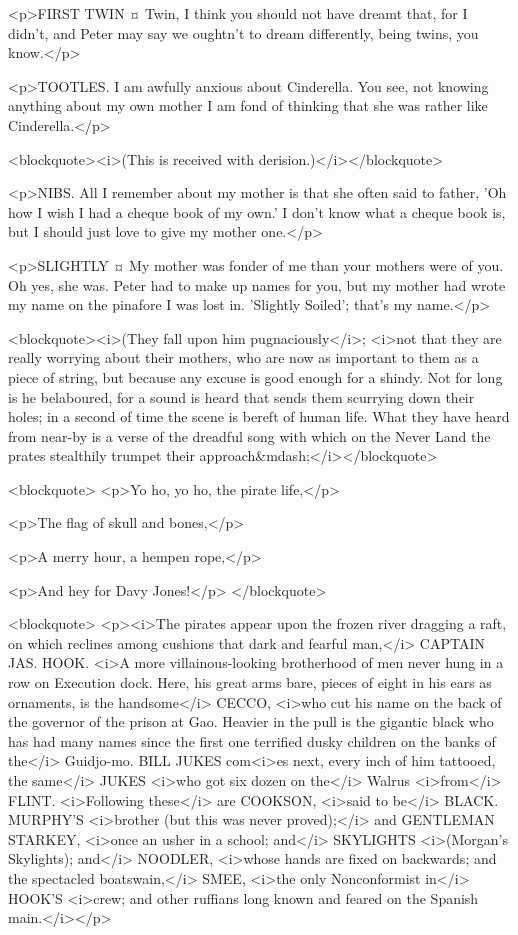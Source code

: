 <p>FIRST TWIN ¤
Twin, I think you should not have dreamt that, for I didn't, and Peter may say we oughtn't to dream differently, being twins, you know.</p>

<p>TOOTLES. I am awfully anxious about Cinderella. You see, not knowing anything about my own mother I am fond of thinking that she was rather like Cinderella.</p>

<blockquote><i>(This is received with derision.)</i></blockquote>

<p>NIBS. All I remember about my mother is that she often said to father, 'Oh how I wish I had a cheque book of my own.' I don't know what a cheque book is, but I should just love to give my mother one.</p>

<p>SLIGHTLY ¤
My mother was fonder of me than your mothers were of you.
Oh yes, she was. Peter had to make up names for you, but my mother had wrote my name on the pinafore I was lost in. 'Slightly Soiled'; that's my name.</p>

<blockquote><i>(They fall upon him pugnaciously</i>; <i>not that they are really worrying about their mothers, who are now as important to them as a piece of string, but because any excuse is good enough for a shindy. Not for long is he belaboured, for a sound is heard that sends them scurrying down their holes; in a second of time the scene is bereft of human life. What they have heard from near-by is a verse of the dreadful song with which on the Never Land the prates stealthily trumpet their approach&mdash;</i></blockquote>

<blockquote> <p>Yo ho, yo ho, the pirate life,</p>

<p>The flag of skull and bones,</p>

<p>A merry hour, a hempen rope,</p>

<p>And hey for Davy Jones!</p> </blockquote>

<blockquote> <p><i>The pirates appear upon the frozen river dragging a raft, on which reclines among cushions that dark and fearful man,</i> CAPTAIN JAS. HOOK. <i>A more villainous-looking brotherhood of men never hung in a row on Execution dock. Here, his great arms bare, pieces of eight in his ears as ornaments, is the handsome</i> CECCO, <i>who cut his name on the back of the governor of the prison at Gao. Heavier in the pull is the gigantic black who has had many names since the first one terrified dusky children on the banks of the</i> Guidjo-mo. BILL JUKES com<i>es next, every inch of him tattooed, the same</i> JUKES <i>who got six dozen on the</i> Walrus <i>from</i> FLINT. <i>Following these</i> are COOKSON, <i>said to be</i> BLACK. MURPHY'S <i>brother (but this was never proved);</i> and GENTLEMAN STARKEY, <i>once an usher in a school; and</i> SKYLIGHTS <i>(Morgan's Skylights); and</i> NOODLER, <i>whose hands are fixed on backwards; and the spectacled boatswain,</i> SMEE, <i>the only Nonconformist in</i> HOOK'S <i>crew; and other ruffians long known and feared on the Spanish main.</i></p>

